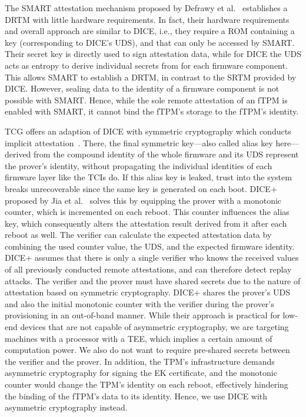 

The SMART attestation mechanism proposed by Defrawy et al.~\cite{EURECOM+3536} establishes a \ac{DRTM} with little hardware requirements.
In fact, their hardware requirements and overall approach are similar to \ac{DICE}, i.e., they require a ROM containing a key (corresponding to DICE's \ac{UDS}), and that can only be accessed by SMART\@.
Their secret key is directly used to sign attestation data, while for \ac{DICE} the \ac{UDS} acts as entropy to derive individual secrets from for each firmware component.
This allows SMART to establish a \ac{DRTM}, in contrast to the \ac{SRTM} provided by \ac{DICE}.
However, sealing data to the identity of a firmware component is not possible with SMART\@.
Hence, while the sole remote attestation of an \ac{fTPM} is enabled with SMART, it cannot bind the fTPM's storage to the fTPM's identity.

\ac{TCG} offers an adaption of \ac{DICE} with symmetric cryptography which conducts implicit attestation~\cite{dice-symmetric-arch}.
There, the final symmetric key---also called alias key here---derived from the compound identity of the whole firmware and its UDS represent the prover's identity, without propagating the individual identities of each firmware layer like the \acp{TCI} do.
If this alias key is leaked, trust into the system breaks unrecoverable since the same key is generated on each boot.
DICE+ proposed by Jia et al.~\cite{Jia2020} solves this by equipping the prover with a monotonic counter, which is incremented on each reboot.
This counter influences the alias key, which consequently alters the attestation result derived from it after each reboot as well.
The verifier can calculate the expected attestation data by combining the used counter value, the UDS, and the expected firmware identity.
DICE+ assumes that there is only a single verifier who knows the received values of all previously conducted remote attestations, and can therefore detect replay attacks.
The verifier and the prover must have shared secrets due to the nature of attestation based on symmetric cryptography.
DICE+ shares the prover's UDS and also the initial monotonic counter with the verifier during the prover's provisioning in an out-of-band manner.
While their approach is practical for low-end devices that are not capable of asymmetric cryptography, we are targeting machines with a processor with a \ac{TEE}, which implies a certain amount of computation power.
We also do not want to require pre-shared secrets between the verifier and the prover.
In addition, the TPM's infrastructure demands asymmetric cryptography for signing the EK certificate, and the monotonic counter would change the TPM's identity on each reboot, effectively hindering the binding of the fTPM's data to its identity.
Hence, we use DICE with asymmetric cryptography instead.

